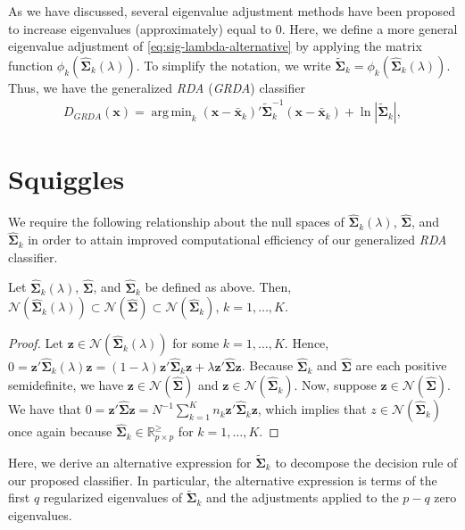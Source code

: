\documentclass[11pt]{article}
\newcommand{\xbar}{\bar{\bm x}}
\DeclareMathOperator*{\argmin}{arg\,min}
\begin{document}
As we have discussed, several eigenvalue adjustment methods have been proposed to increase eigenvalues (approximately) equal to 0. Here, we define a more general eigenvalue adjustment of \eqref{eq:sig-lambda-alternative} by applying the matrix function $\phi_k(\widehat{\bm \Sigma}_k(\lambda))$. To simplify the notation, we write $\tilde{\bm \Sigma}_k = \phi_k(\widehat{\bm \Sigma}_k(\lambda))$. Thus, we have the generalized \emph{RDA} (\emph{GRDA}) classifier
\begin{align}
	D_{GRDA}(\bm x) = \argmin_{k}  (\bm x - \xbar_k)'\tilde{\bm\Sigma}_k^{-1}(\bm x - \xbar_k)  + \ln |\tilde{\bm\Sigma}_k|, \label{eq:grda}
\end{align}

\section{Squiggles}
We require the following relationship about the null spaces of $\widehat{\bm \Sigma}_k(\lambda)$, $\widehat{\bm \Sigma}$, and $\widehat{\bm \Sigma}_k$ in order to attain improved computational efficiency of our generalized \emph{RDA} classifier.

\begin{lemma}\label{lemma:null-spaces}
Let $\widehat{\bm \Sigma}_k(\lambda)$, $\widehat{\bm \Sigma}$, and $\widehat{\bm \Sigma}_k$ be defined as above. Then, $\mathcal{N}(\widehat{\bm \Sigma}_k(\lambda)) \subset \mathcal{N}(\widehat{\bm \Sigma}) \subset \mathcal{N}(\widehat{\bm \Sigma}_k)$, $k = 1, \ldots, K$.
\end{lemma}
\begin{proof}
Let $\bm z \in \mathcal{N}(\widehat{\bm \Sigma}_k(\lambda))$ for some $k = 1, \ldots, K$. Hence, $0 = \bm z' \widehat{\bm \Sigma}_k(\lambda) \bm z = (1 - \lambda) \bm z' \widehat{\bm \Sigma}_k \bm z + \lambda \bm z' \widehat{\bm \Sigma} \bm z$. Because $\widehat{\bm \Sigma}_k$ and $\widehat{\bm \Sigma}$ are each positive semidefinite, we have $\bm z \in \mathcal{N}(\widehat{\bm \Sigma})$ and $\bm z \in \mathcal{N}(\widehat{\bm \Sigma}_k)$. Now, suppose $\bm z \in \mathcal{N}(\widehat{\bm \Sigma})$. We have that $0 = \bm z' \widehat{\bm \Sigma} \bm z = N^{-1} \sum_{k = 1}^K n_k \bm z' \widehat{\bm \Sigma}_k \bm z$, which implies that $z \in \mathcal{N}(\widehat{\bm \Sigma}_k)$ once again because $\widehat{\bm \Sigma}_k \in \mathbb{R}_{p \times p}^{\ge}$ for $k = 1, \ldots, K$.
\end{proof}

Here, we derive an alternative expression for $\tilde{\bm \Sigma}_k$ to decompose the decision rule of our proposed classifier. In particular, the alternative expression is terms of the first $q$ regularized eigenvalues of $\tilde{\bm \Sigma}_k$ and the adjustments applied to the $p - q$ zero eigenvalues.
\end{document}
